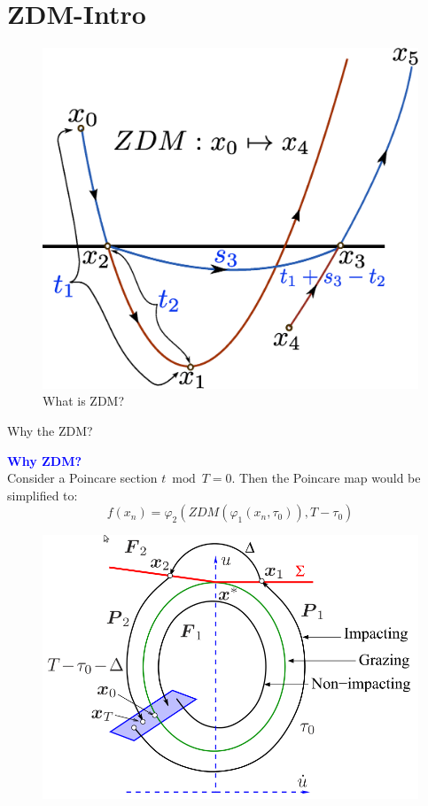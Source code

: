 \documentclass[xcolor=x11names,compress]{beamer}
\renewcommand{\(}{\begin{columns}}
\renewcommand{\)}{\end{columns}}
\newcommand{\<}[1]{\begin{column}{#1}}
\renewcommand{\>}{\end{column}}
\newcommand{\hlb}[1]{\textbf{\textcolor{blue}{#1}}}
\begin{document}
\section{ZDM-Intro}
\begin{frame}{}

\begin{figure}
\caption{What is ZDM?}
\begin{center}
\includegraphics[width=0.7\columnwidth]{ZDM}
\end{center}
\end{figure}

\end{frame}


\begin{frame}{Why the ZDM?}

\hlb{ Why ZDM?}\\
Consider a Poincare section $t\bmod T=0$. Then the Poincare map would be 
simplified to:\\
\[
f(x_n)=\varphi_2(ZDM(\varphi_1(x_n,\tau_0)),T-\tau_0)
\] 
\begin{figure}
\begin{center}
\includegraphics[height=0.45\textheight]{graz}
\end{center}
\end{figure}
\end{frame}
\end{document}
